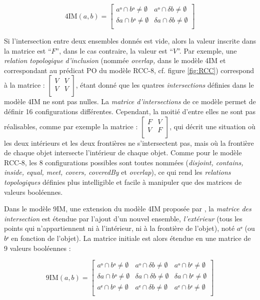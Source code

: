 \begin{equation}
  \label{eq:matrice_4IM}
  \text{4IM}(a,b) =
  \begin{bmatrix}
    aᵒ ∩ bᵒ ≠ ∅ & aᵒ ∩ δb ≠ ∅ \\
    δa ∩ bᵒ ≠ ∅ & δa ∩ δb ≠ ∅ \\
  \end{bmatrix}
\end{equation}

Si l'intersection entre deux ensembles donnés est vide, alors la
valeur inscrite dans la matrice est \enquote{\(F\)}, dans le cas
contraire, la valeur est \enquote{\(V\)}. Par exemple, une
\emph{relation topologique} \emph{d'inclusion} (nommée \emph{overlap,}
dans le modèle 4IM et correspondant au prédicat PO du modèle RCC-8,
cf. figure \ref{fig:RCC}) correspond à la matrice :
%
\(\left[
  \begin{smallmatrix}
    V&V\\
    V&V\\
  \end{smallmatrix}
\right]\),
%
étant donné que les quatres \emph{intersections} définies dans le
modèle 4IM ne sont pas nulles. La \emph{matrice d'intersections} de ce
modèle permet de définir 16 configurations différentes. Cependant, la
moitié d'entre elles ne sont pas réalisables, comme par exemple la
matrice :
%
\(\left[
  \begin{smallmatrix}
    F&V\\
    V&F\\
  \end{smallmatrix}
\right]\),
%
qui décrit une situation où les deux intérieurs et les deux frontières
ne s'intersectent pas, mais où la frontière de chaque objet intersecte
l'intérieur de chaque objet. Comme pour le modèle RCC-8, les 8
configurations possibles sont toutes nommées (\emph{disjoint,
  contains, inside, equal, meet, covers, coveredBy} et
\emph{overlap}), ce qui rend les \emph{relations topologiques}
définies plus intelligible et facile à manipuler que des matrices de
valeurs booléennes.

Dans le modèle 9IM, une extension du modèle 4IM proposée par
\textcite{Egenhofer1991}, la \emph{matrice des intersection} est
étendue par l'ajout d'un nouvel ensemble, \emph{l'extérieur} (\ie tous
les points qui n'appartiennent ni à l'intérieur, ni à la frontière de
l'objet), noté \(aᵉ\) (ou \(bᵉ\) en fonction de l'objet). La matrice
initiale est alors étendue en une matrice de 9 valeurs booléennes :

\begin{equation}
  \label{eq:matrice_9IM}
  \text{9IM}(a,b) =
  \begin{bmatrix}
    aᵒ ∩ bᵒ ≠ ∅ & aᵒ ∩ δb ≠ ∅ & aᵒ ∩ bᵉ ≠ ∅ \\
    δa ∩ bᵒ ≠ ∅ & δa ∩ δb ≠ ∅ & δa ∩ bᵉ ≠ ∅ \\
    aᵉ ∩ bᵒ ≠ ∅ & aᵉ ∩ δb ≠ ∅ & aᵉ ∩ bᵉ ≠ ∅ \\
  \end{bmatrix}
\end{equation}

